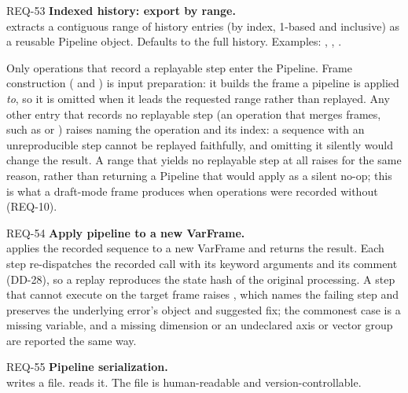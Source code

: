 \begin{reqbox}{REQ-53}{\stable}
\textbf{Indexed history: export by range.}\\
 extracts a contiguous
range of history entries (by index, 1-based and inclusive) as a reusable
Pipeline object. Defaults to the full history. Examples:
,
,
.

Only operations that record a replayable step enter the Pipeline. Frame
construction ( and ) is input preparation: it
builds the frame a pipeline is applied \emph{to}, so it is omitted when
it leads the requested range rather than replayed. Any other entry that
records no replayable step (an operation that merges frames, such as
 or ) raises
 naming the operation and its index: a
sequence with an unreproducible step cannot be replayed faithfully, and
omitting it silently would change the result. A range that yields no
replayable step at all raises for the same reason, rather than returning
a Pipeline that would apply as a silent no-op; this is what a draft-mode
frame produces when operations were recorded without
 (REQ-10).
\end{reqbox}

\begin{reqbox}{REQ-54}{\stable}
\textbf{Apply pipeline to a new VarFrame.}\\
 applies the recorded sequence to a new
VarFrame and returns the result. Each step re-dispatches the recorded
call with its keyword arguments and its comment (DD-28), so a replay
reproduces the state hash of the original processing. A step that cannot
execute on the target frame raises ,
which names the failing step and preserves the underlying error's object
and suggested fix; the commonest case is a missing variable, and a
missing dimension or an undeclared axis or vector group are reported the
same way.
\end{reqbox}

\begin{reqbox}{REQ-55}{\stable}
\textbf{Pipeline serialization.}\\
 writes a  file.
 reads it. The file is human-readable and
version-controllable.
\end{reqbox}

